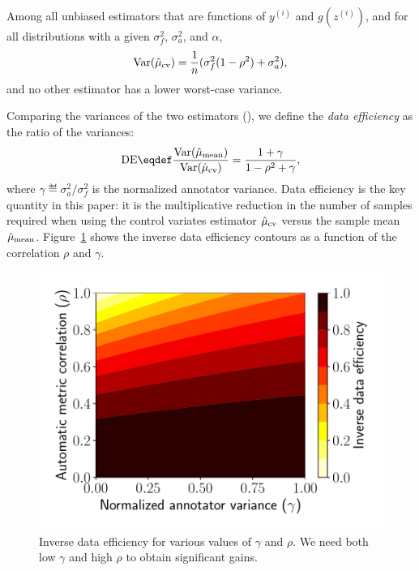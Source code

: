 \begin{theorem}
\label{thm:main}
Among all unbiased
  estimators that are functions of $y^{(i)}$ and $g(z^{(i)})$, and for all distributions with a given $\sigma^2_f$, $\sigma^2_a$, and $\alpha$,
\begin{align}
  \label{eqn:varcontrol}
  \operatorname{Var}(\hat \mu_\text{cv}) = \frac{1}{n} (\sigma^2_f (1 - \rho^2) + \sigma^2_a),
\end{align}
and no other estimator has a lower worst-case variance.
\end{theorem}

Comparing the variances of the two estimators (),
we define the \emph{data efficiency} as the ratio of the variances:
\begin{align}
\DE \eqdef \frac{\Var(\musimple)}{\Var(\mucontrol)} = \frac{1 + \gamma}{1-\rho^2 + \gamma},
\end{align}
where $\gamma \eqdef \sigma^2_a / \sigma^2_f$ is the normalized annotator variance.
Data efficiency is the key quantity in this paper:
  it is the multiplicative reduction in the number of samples required
  when using the control variates estimator $\hat \mu_\text{cv}$ versus the sample mean $\hat \mu_\text{mean}$.
Figure~\ref{fig:savings} shows the inverse data efficiency contours as a function of the correlation $\rho$
and $\gamma$.

\begin{figure}
\centering
  \includegraphics[width=0.8\columnwidth]{figures/savings}
  \caption[Inverse data efficiency with the control variates estimator]  {\label{fig:savings} Inverse data efficiency for various values of
  $\gamma$ and $\rho$.  We need both low $\gamma$ and high $\rho$ to obtain
  significant gains.
  }
\end{figure}

